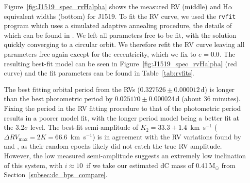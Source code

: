 \documentclass[twocolumn]{aastex631}
\begin{document}
\begin{figure*}
\centering
{}
\caption{ TOP: SDSS spectrum for the dC+DA SDSS J151905.96+500702.9, in black. The hot WD is visible, as are the carbon bands of C$_2$ and CN. The spectrum also shows H$\alpha$ emission. The best fitting model atmosphere to the DA component of the dC+WD composite J1519 is shown in blue, with the inset to the right showing a zoomed-in, stacked view of the Balmer lines used in the model fit (the black lines are the normalized flux of the WD component, and the blue lines are the best fitting model atmosphere, dashed grey lines means that that Balmer line was not used in the fit due to poor quality). The resulting dC component --- simply the observed spectrum with the WD model subtracted --- is shown in red. MIDDLE: RV as measured from the H$\alpha$ line for J1519, phased on the time of periastron passage from the RV fit, and the fit RV period of $0.327526$\,d. The red solid line represents the best fitting model. BOTTOM: Equivalent widths measured from the H$\alpha$ line, phased on the fit RV period of $0.327526$\,d. The blue curve is the best-fit model to the data of a single sinusoid. The y-axis has been inverted so that smaller equivalent width values (more emission) are up.}
\label{fig:J1519_spec_rvHalpha}
\end{figure*}

Figure~\ref{fig:J1519_spec_rvHalpha} shows the measured RV (middle) and H$\alpha$ equivalent widths (bottom) for J1519. To fit the RV curve, we used the \texttt{rvfit} program which uses a simulated adaptive annealing procedure, the details of which can be found in \citet{rvfit}. We left all parameters free to be fit, with the solution quickly converging to a circular orbit. We therefore refit the RV curve leaving all parameters free again except for the eccentricity, which we fix to $e=0.0$. The resulting best-fit model can be seen in Figure~\ref{fig:J1519_spec_rvHalpha} (red curve) and the fit parameters can be found in Table~\ref{tab:rvfits}.

The best fitting orbital period from the RVs ($0.327526\pm0.000012$\,d) is longer than the best photometric period by $0.025170\pm0.000024$\,d (about 36 minutes).  Fixing the period in the RV fitting procedure to that of the photometric period results in a poorer model fit, with the longer period model being a better fit at the 3.2$\sigma$ level. The best-fit semi-amplitude of $K_2 =33.3\pm1.4$~km~s$^{-1}$ ($\Delta RV_{\textrm{max}} = 2K = 66.6$~km~s$^{-1}$) is in agreement with the RV variations found by \citet{Whitehouse2018} and \citet{Roulston2019}, as their random epochs likely did not catch the true RV amplitude. However, the low measured semi-amplitude suggests an extremely low inclination of this system, with $i \approx 10$\arcdeg\ if we take our estimated dC mass of 0.41\,M$_\odot$ from Section~\ref{subsec:dc_bps_compare}. 
\end{document}
